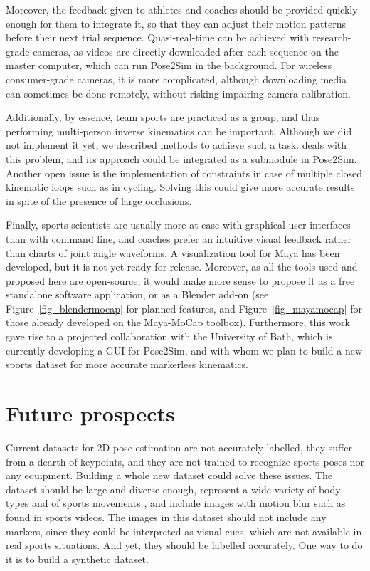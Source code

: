 Moreover, the feedback given to athletes and coaches should be provided quickly enough for them to integrate it, so that they can adjust their motion patterns before their next trial sequence. Quasi-real-time can be achieved with research-grade cameras, as videos are directly downloaded after each sequence on the master computer, which can run Pose2Sim in the background. For wireless consumer-grade cameras, it is more complicated, although downloading media can sometimes be done remotely, without risking impairing camera calibration. 

Additionally, by essence, team sports are practiced as a group, and thus performing multi-person inverse kinematics can be important. Although we did not implement it yet, we described methods to achieve such a task. \cite{Easymocap2021} deals with this problem, and its approach could be integrated as a submodule in Pose2Sim. Another open issue is the implementation of constraints in case of multiple closed kinematic loops such as in cycling. Solving this could give more accurate results in spite of the presence of large occlusions.

Finally, sports scientists are usually more at ease with graphical user interfaces than with command line, and coaches prefer an intuitive visual feedback rather than charts of joint angle waveforms. A visualization tool for Maya has been developed, but it is not yet ready for release. Moreover, as all the tools used and proposed here are open-source, it would make more sense to propose it as a free standalone software application, or as a Blender add-on (see Figure~\ref{fig_blendermocap} for planned features, and Figure~\ref{fig_mayamocap} for those already developed on the Maya-MoCap toolbox). Furthermore, this work gave rise to a projected collaboration with the University of Bath, which is currently developing a GUI for Pose2Sim, and with whom we plan to build a new sports dataset for more accurate markerless kinematics. 


\section*{Future prospects}
Current datasets for 2D pose estimation are not accurately labelled, they suffer from a dearth of keypoints, and they are not trained to recognize sports poses nor any equipment. Building a whole new dataset could solve these issues. The dataset should be large and diverse enough, represent a wide variety of body types and of sports movements \cite{Seethapathi2019}, and include images with motion blur such as found in sports videos. The images in this dataset should not include any markers, since they could be interpreted as visual cues, which are not available in real sports situations. And yet, they should be labelled accurately. One way to do it is to build a synthetic dataset. 

